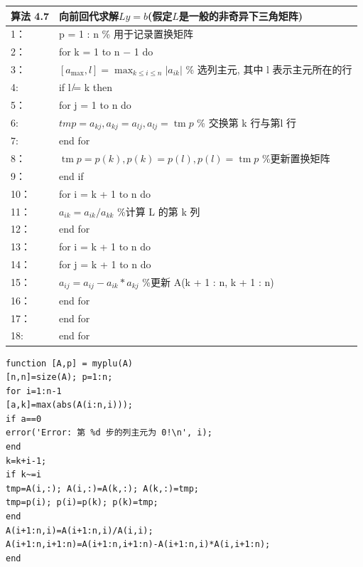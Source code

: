 \documentclass[12pt,a4paper]{article}
\begin{document}
\begin{table}  
	\begin{tabular*}{16cm}{ll}  
		\hline  
		算法 4.7 &向前回代求解$Ly =b$(假定$L$是一般的非奇异下三角矩阵)\\  
		\hline  
		1：   & p = 1 : n \% 用于记录置换矩阵\\  
		2：   & for k = 1 to n − 1 do\\
		3：   & \qquad $\left[a_{\max }, l\right]=\max _{k \leq i \leq n}\left|a_{i k}\right|$ \% 选列主元, 其中 l 表示主元所在的行 \\
		4:    & \qquad if l ̸= k then\\
		5：   & \qquad \qquad for j = 1 to n do\\
		6:    & \qquad \qquad \qquad $t m p=a_{k j}, a_{k j}=a_{l j}, a_{l j}=\operatorname{tm} p$ \% 交换第 k 行与第l 行\\
		7:    &\qquad \qquad end for\\
		8：   & \qquad \qquad $\operatorname{tm} p=p(k), p(k)=p(l), p(l)=\operatorname{tm} p$ \%更新置换矩阵 \\
		9：   & \qquad end if\\
		10：   & \qquad for i = k + 1 to n do\\
		11：   & \qquad \qquad $a_{i k}=a_{i k} / a_{k k}$ \%计算 L 的第 k 列\\
		12：   & \qquad end for\\
		13：   & \qquad for i = k + 1 to n do\\
		14：   & \qquad \qquad for j = k + 1 to n do\\
		15：   & \qquad \qquad \qquad $a_{i j}=a_{i j}-a_{i k} * a_{k j}$ \%更新 A(k + 1 : n, k + 1 : n) \\
		16：   & \qquad \qquad end for \\
		17：   & \qquad end for \\
		18:    & end for \\
		\hline  
	\end{tabular*}  
\end{table}

\begin{lstlisting}[language={[ANSI]C}] 
% Matlab code 2 : 部分选主元 LU 分解
function [A,p] = myplu(A)
[n,n]=size(A); p=1:n;
for i=1:n-1
[a,k]=max(abs(A(i:n,i)));
if a==0
error('Error: 第 %d 步的列主元为 0!\n', i);
end
k=k+i-1;
if k~=i
tmp=A(i,:); A(i,:)=A(k,:); A(k,:)=tmp;
tmp=p(i); p(i)=p(k); p(k)=tmp;
end
A(i+1:n,i)=A(i+1:n,i)/A(i,i);
A(i+1:n,i+1:n)=A(i+1:n,i+1:n)-A(i+1:n,i)*A(i,i+1:n);
end
\end{lstlisting}
\end{document}
